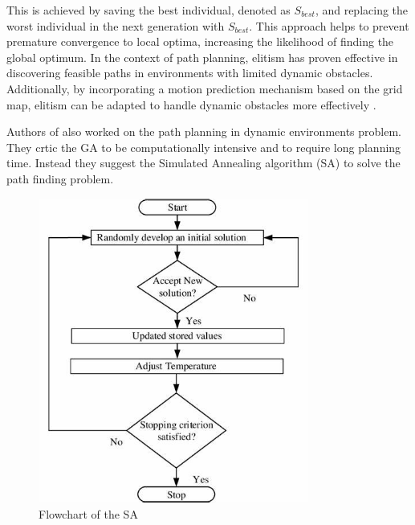 This is achieved by saving the best individual, denoted as \(S_{best}\), and replacing the worst individual in the 
next generation with \(S_{best}\). This approach helps to prevent premature convergence to local optima, increasing 
the likelihood of finding the global optimum. In the context of path planning, elitism has proven effective 
in discovering feasible paths in environments with limited dynamic obstacles. Additionally, by incorporating 
a motion prediction mechanism based on the grid map, elitism can be adapted to handle dynamic obstacles more 
effectively \cite{R38}.

Authors of \cite{R40} also worked on the path planning in dynamic environments problem. They crtic the GA to be computationally
intensive and to require long planning time. Instead they suggest the Simulated Annealing algorithm (SA)
to solve the path finding problem. 

\begin{figure}[H]
    \centering
    \includegraphics[width=3.5in]{images/Chap1/SA.jpg}
    \caption{Flowchart of the SA \cite{R41}}
    \label{SA}
\end{figure}

